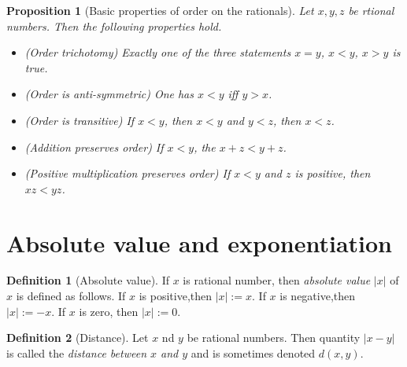 \documentclass[
]{book}
\providecommand{\tightlist}{%
  \setlength{\itemsep}{0pt}\setlength{\parskip}{0pt}}
\newtheorem{proposition}{Proposition}[chapter]
\theoremstyle{definition}
\newtheorem{definition}{Definition}[chapter]
\theoremstyle{definition}
\theoremstyle{definition}
\theoremstyle{definition}
\theoremstyle{remark}
\begin{document}
\begin{proposition}[Basic properties of order on the rationals]

Let \(x,y,z\) be rtional numbers. Then the following properties hold.

\begin{itemize}
\tightlist
\item
  (Order trichotomy) Exactly one of the three statements \(x=y\), \(x<y\), \(x>y\) is true.
\item
  (Order is anti-symmetric) One has \(x<y\) iff \(y>x\).
\item
  (Order is transitive) If \(x<y\), then \(x<y\) and \(y<z\), then \(x<z\).
\item
  (Addition preserves order) If \(x<y\), the \(x+z<y+z\).
\item
  (Positive multiplication preserves order) If \(x<y\) and \(z\) is positive, then \(xz<yz\).
\end{itemize}

\end{proposition}

\section{Absolute value and exponentiation}\label{absolute-value-and-exponentiation}

\begin{definition}[Absolute value]
If \(x\) is rational number, then \emph{absolute value} \(|x|\) of \(x\) is defined as follows. If \(x\) is positive,then \(|x|:=x\). If \(x\) is negative,then \(|x|:=-x\). If \(x\) is zero, then \(|x|:=0\).
\end{definition}

\begin{definition}[Distance]
Let \(x\) nd \(y\) be rational numbers. Then quantity \(|x-y|\) is called the \emph{distance between \(x\) and \(y\)} and is sometimes denoted \(d(x,y)\).
\end{definition}
\end{document}
